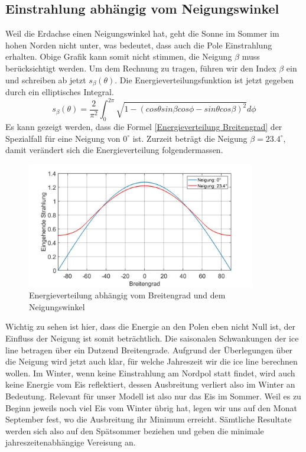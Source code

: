 \begin{refsection}
\subsection{Einstrahlung abhängig vom Neigungswinkel}
Weil die Erdachse einen Neigungswinkel hat, geht die Sonne im Sommer im hohen Norden nicht unter, was bedeutet, dass auch die Pole Einstrahlung erhalten. Obige Grafik kann somit nicht stimmen, die Neigung $\beta$ muss berücksichtigt werden. Um dem Rechnung zu tragen, führen wir den Index $\beta$ ein und schreiben ab jetzt $s_{\beta}(\theta)$. Die Energieverteilungsfunktion ist jetzt gegeben durch ein elliptisches Integral.
\begin{equation}\label{Energieverteilung Neigung}
s_{\beta}(\theta)
=
\frac{2}{\pi^2}\int_{0}^{2\pi}\sqrt{1-(cos\theta sin\beta cos\phi-sin\theta cos\beta)^2}d\phi
\end{equation}
Es kann gezeigt werden, dass die Formel \ref{Energieverteilung Breitengrad} der Spezialfall für eine Neigung von $0^{\circ}$ ist. Zurzeit beträgt die Neigung $\beta=23.4^{\circ}$, damit verändert sich die Energieverteilung folgendermassen.
\begin{figure}[H]
	\centering
	\includegraphics[width=10cm]{eis/Einstrahlung_abh_mit_und_ohne_Neigung.jpg}
	\caption{Energieverteilung abhängig vom Breitengrad und dem Neigungswinkel}
\end{figure}
Wichtig zu sehen ist hier, dass die Energie an den Polen eben nicht Null ist, der Einfluss der Neigung ist somit beträchtlich. Die saisonalen Schwankungen der ice line betragen über ein Dutzend Breitengrade. Aufgrund der Überlegungen über die Neigung wird jetzt auch klar, für welche Jahreszeit wir die ice line berechnen wollen. Im Winter, wenn keine Einstrahlung am Nordpol statt findet, wird auch keine Energie vom Eis reflektiert, dessen Ausbreitung verliert also im Winter an Bedeutung. Relevant für unser Modell ist also nur das Eis im Sommer. Weil es zu Beginn jeweils noch viel Eis vom Winter übrig hat, legen wir uns auf den Monat September fest, wo die Ausbreitung ihr Minimum erreicht. Sämtliche Resultate werden sich also auf den Spätsommer beziehen und geben die minimale jahreszeitenabhängige Vereisung an.

\end{refsection}
